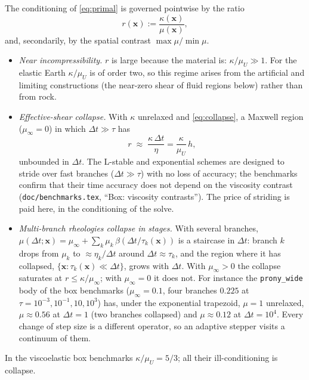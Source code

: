 \documentclass[11pt]{article}
\numberwithin{equation}{section}
\theoremstyle{remark}
\newcommand{\vx}{\mathbf{x}}
\newcommand{\code}[1]{\texttt{#1}}
\begin{document}
The conditioning of \eqref{eq:primal} is governed pointwise by the ratio
\begin{equation}
  r(\vx) := \frac{\kappa(\vx)}{\mu(\vx)},
\end{equation}
and, secondarily, by the spatial contrast $\max\mu/\min\mu$.
\begin{itemize}
\item \emph{Near incompressibility.} $r$ is large because the material
  is: $\kappa/\mu_U \gg 1$. For the elastic Earth $\kappa/\mu_U$ is of
  order two, so this regime arises from the artificial and limiting
  constructions (the near-zero shear of fluid regions below) rather than
  from rock.
\item \emph{Effective-shear collapse.} With $\kappa$ unrelaxed and
  \eqref{eq:collapse}, a Maxwell region ($\mu_\infty = 0$) in which
  $\Delta t\gg\tau$ has
  \begin{equation}
    r \;\approx\; \frac{\kappa\,\Delta t}{\eta}
      = \frac{\kappa}{\mu_U}\, h,
  \end{equation}
  unbounded in $\Delta t$. The L-stable and exponential schemes are
  designed to stride over fast branches ($\Delta t\gg\tau$) with no loss of
  accuracy; the benchmarks confirm that their time accuracy does not
  depend on the viscosity contrast (\code{doc/benchmarks.tex}, ``Box:
  viscosity contrasts''). The price of striding is paid here, in the
  conditioning of the solve.
\item \emph{Multi-branch rheologies collapse in stages.} With several
  branches, $\mu(\Delta t;\vx) = \mu_\infty + \sum_k \mu_k\,
  \beta(\Delta t/\tau_k(\vx))$ is a staircase in $\Delta t$: branch $k$
  drops from $\mu_k$ to $\approx\eta_k/\Delta t$ around $\Delta t\approx
  \tau_k$, and the region where it has collapsed, $\{\vx :
  \tau_k(\vx)\ll\Delta t\}$, grows with $\Delta t$. With $\mu_\infty > 0$
  the collapse saturates at $r \le \kappa/\mu_\infty$; with $\mu_\infty =
  0$ it does not. For instance the \code{prony\_wide} body of the box
  benchmarks ($\mu_\infty = 0.1$, four branches $0.225$ at $\tau =
  10^{-3},10^{-1},10,10^{3}$) has, under the exponential trapezoid,
  $\mu = 1$ unrelaxed, $\mu \approx 0.56$ at $\Delta t = 1$ (two branches
  collapsed) and $\mu \approx 0.12$ at $\Delta t = 10^4$. Every change of
  step size is a different operator, so an adaptive stepper visits a
  continuum of them.
\end{itemize}
In the viscoelastic box benchmarks $\kappa/\mu_U = 5/3$; all their
ill-conditioning is collapse.
\end{document}
